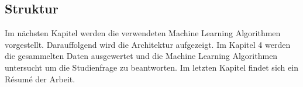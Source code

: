 \subsection{Struktur}
Im nächsten Kapitel werden die verwendeten Machine Learning Algorithmen vorgestellt. Darauffolgend wird die Architektur aufgezeigt. Im Kapitel 4 werden die gesammelten Daten ausgewertet und die Machine Learning Algorithmen untersucht um die Studienfrage zu beantworten. Im letzten Kapitel findet sich ein Résumé der Arbeit.